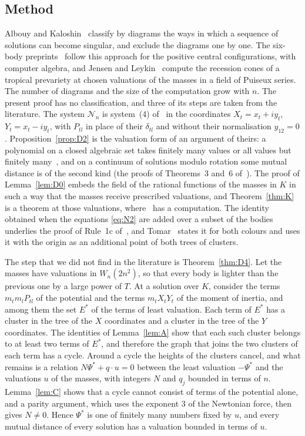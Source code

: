 \documentclass[11pt]{amsart}
\theoremstyle{definition}
\theoremstyle{remark}
\numberwithin{equation}{section}
\newcommand{\cN}{\mathcal{N}}
\newcommand{\Ps}{\Psi^{*}}
\newcommand{\Es}{E^{*}}
\begin{document}
\subsection*{Method} Albouy and Kaloshin~\cite{albouykaloshin2012} classify by diagrams the ways in which
a sequence of solutions can become singular, and exclude the diagrams one by one. The six-body
preprints~\cite{tomar6,chentong6} follow this approach for the positive central configurations, with
computer algebra, and Jensen and Leykin~\cite{jensenleykin2025} compute the recession cones of a tropical
prevariety at chosen valuations of the masses in a field of Puiseux series. The number of diagrams and the size of the computation grow with $n$. The
present proof has no classification, and three of its steps are taken from the literature. The
system $\cN_n$ is system~(4) of~\cite[\S 2]{albouykaloshin2012} in the coordinates $X_t = x_t + i y_t$,
$Y_t = x_t - i y_t$, with $P_{tl}$ in place of their $\delta_{tl}$ and without their normalisation
$y_{12} = 0$.
Proposition~\ref{prop:D2} is the valuation form of an argument of theirs: a polynomial on a closed
algebraic set takes finitely many values or all values but finitely
many~\cite[Lemma~1]{albouykaloshin2012}, and on a continuum of solutions modulo rotation some mutual
distance is of the second kind (the proofs of Theorems~3 and~6
of~\cite{albouykaloshin2012}). The proof of Lemma~\ref{lem:D0} embeds the field of the rational functions of the
masses in $K$ in such a way that the masses receive prescribed valuations, and Theorem~\ref{thm:K} is a
theorem at those valuations, where~\cite{jensenleykin2025} has a computation. The identity obtained when the
equations \eqref{eq:N2} are added over a subset of the bodies underlies the proof of Rule~1c
of~\cite[p.~546]{albouykaloshin2012}, and Tomar~\cite[\S 2.3, \S 4.1 and \S 9.1]{tomar6} states it for
both colours and uses it with the origin as an additional point of both trees of clusters.

The step that we did not find in the literature is Theorem~\ref{thm:D4}. Let the masses have valuations
in $W_n(2n^2)$, so that every body is lighter than the previous one by a large power of $T$. At a solution
over $K$, consider the terms $m_t m_l P_{tl}$ of the potential and the terms $m_t X_t Y_t$ of the moment
of inertia, and among them the set $\Es$ of the terms of least valuation. Each term of $\Es$ has a cluster in the
tree of the $X$ coordinates and a cluster in the tree of the $Y$ coordinates. The identities of
Lemma~\ref{lem:A} show that each such cluster belongs to at least two terms of $\Es$, and therefore the
graph that joins the two clusters of each term has a cycle. Around a cycle the heights of the clusters
cancel, and what remains is a relation $N \Ps + q \cdot u = 0$ between the least valuation $-\Ps$ and the
valuations $u$ of the masses, with integers $N$ and $q_j$ bounded in terms of $n$. Lemma~\ref{lem:C}
shows that a cycle cannot consist of terms of the potential alone, and a parity argument, which uses the
exponent $3$ of the Newtonian force, then gives $N \ne 0$. Hence $\Ps$ is one of finitely many numbers
fixed by $u$, and every mutual distance of every solution has a valuation bounded in terms of $u$.
\end{document}
